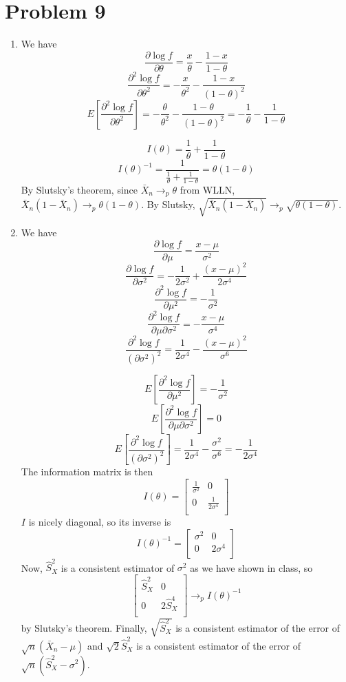 \documentclass[10pt,letter]{article}
\begin{document}
\section*{Problem 9}
\begin{enumerate}[label=(\alph*)]
\item We have
\[ \frac{\partial \log f}{\partial \theta} = \frac{x}{\theta} - \frac{1-x}{1-\theta} \]
\[ \frac{\partial^2 \log f}{\partial \theta^2} = -\frac{x}{\theta^2} - \frac{1-x}{(1-\theta)^2} \]
\[ E\left[\frac{\partial^2 \log f}{\partial \theta^2} \right] = -\frac{\theta}{\theta^2} - \frac{1-\theta}{(1-\theta)^2} = -\frac{1}{\theta} - \frac{1}{1-\theta} \]

\[ I(\theta) = \frac{1}{\theta} + \frac{1}{1-\theta} \]
\[ I(\theta)^{-1} = \frac{1}{\frac{1}{\theta} + \frac{1}{1-\theta}} = \theta(1-\theta) \]
By Slutsky's theorem, since $\bar{X}_n \to_p \theta$ from WLLN, $\bar{X}_n(1-\bar{X}_n) \to_p \theta(1-\theta)$. By Slutsky, $\sqrt{\bar{X}_n(1-\bar{X}_n)} \to_p \sqrt{\theta(1-\theta)}$.
\item We have
\[ \frac{\partial \log f}{\partial \mu} = \frac{x-\mu}{\sigma^2} \]
\[ \frac{\partial \log f}{\partial \sigma^2} = -\frac{1}{2\sigma^2} + \frac{(x-\mu)^2}{2\sigma^4} \]
\[ \frac{\partial^2 \log f}{\partial \mu^2} = -\frac{1}{\sigma^2} \]
\[ \frac{\partial^2 \log f}{\partial \mu \partial \sigma^2} = -\frac{x-\mu}{\sigma^4} \]
\[ \frac{\partial^2 \log f}{(\partial \sigma^2)^2} = \frac{1}{2\sigma^4} - \frac{(x-\mu)^2}{\sigma^6} \]

\[ E\left[\frac{\partial^2 \log f}{\partial \mu^2}\right] = -\frac{1}{\sigma^2} \]
\[ E\left[\frac{\partial^2 \log f}{\partial \mu \partial \sigma^2}\right] = 0 \]
\[ E\left[\frac{\partial^2 \log f}{(\partial \sigma^2)^2}\right] = \frac{1}{2\sigma^4} - \frac{\sigma^2}{\sigma^6} = - \frac{1}{2\sigma^4} \]
The information matrix is then
\[ I(\theta) = \begin{bmatrix}\frac{1}{\sigma^2} & 0 \\ 0 & \frac{1}{2\sigma^4} \\  \end{bmatrix} \]
$I$ is nicely diagonal, so its inverse is
\[ I(\theta)^{-1} = \begin{bmatrix} \sigma^2 & 0 \\ 0 & 2\sigma^4 \\  \end{bmatrix} \]
Now, $\hat{S}^2_X$ is a consistent estimator of $\sigma^2$ as we have shown in class, so
\[ \begin{bmatrix} \hat{S}^2_X & 0 \\ 0 & 2\hat{S}^4_X \\  \end{bmatrix} \to_p I(\theta)^{-1} \] by Slutsky's theorem. Finally, $\sqrt{\hat{S}^2_X}$ is a consistent estimator of the error of $\sqrt{n}(\bar{X}_n - \mu)$ and $\sqrt{2} \hat{S}^2_X$ is a consistent estimator of the error of $\sqrt{n}(\hat{S}^2_X - \sigma^2)$.
\end{enumerate}
\end{document}

